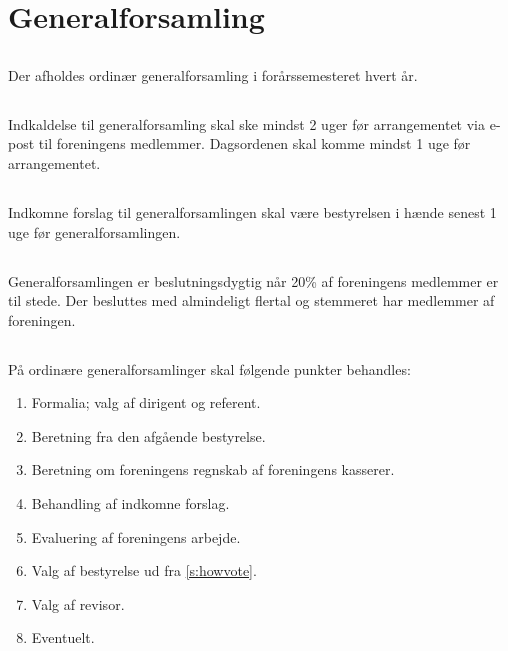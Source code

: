 \documentclass[danish,a4paper,twocolumn,oneside,article]{memoir}
\begin{document}
\chapter{Generalforsamling}

\section{} Der afholdes ordinær generalforsamling i forårssemesteret hvert år.

\section{} Indkaldelse til generalforsamling skal ske mindst 2 uger før arrangementet via e-post til foreningens
medlemmer. Dagsordenen skal komme mindst 1 uge før arrangementet.

\section{} Indkomne forslag til generalforsamlingen skal være bestyrelsen i hænde senest 1 uge før generalforsamlingen.

\section{} Generalforsamlingen er beslutningsdygtig når 20\% af foreningens medlemmer er til stede. Der
besluttes med almindeligt flertal og stemmeret har medlemmer af foreningen.

\section{} På ordinære generalforsamlinger skal følgende punkter behandles:

\begin{enumerate}
\item Formalia; valg af dirigent og referent.
\item Beretning fra den afgående bestyrelse.
\item Beretning om foreningens regnskab af foreningens kasserer.
\item Behandling af indkomne forslag.
\item Evaluering af foreningens arbejde.
\item Valg af bestyrelse ud fra \ref{s:howvote}.
\item Valg af revisor.
\item Eventuelt.
\end{enumerate}
\end{document}
